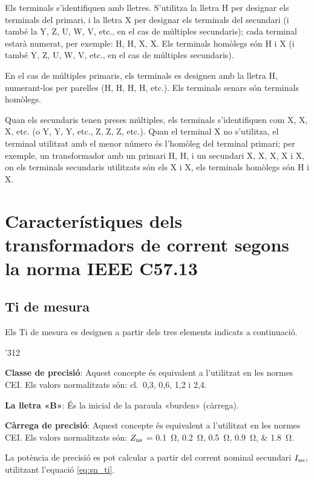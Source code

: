 Els terminals s'identifiquen amb lletres. S'utilitza la lletra H per designar els terminals del primari, i la lletra X per designar els terminals del secundari (i també la Y, Z, U, W, V,  etc.{}, en el cas de múltiples secundaris); cada terminal estarà numerat, per exemple: H, H,  X, X. Els terminals homòlegs són H i X (i també Y, Z, U, W, V, etc.{}, en el cas de múltiples secundaris).

En el cas de múltiples primaris, els terminals es designen amb la lletra H, numerant-los per parelles (H, H, H, H, etc.{}). Els terminals senars són terminals homòlegs.

Quan els secundaris tenen preses múltiples, els terminals s'identifiquen com X, X, X, etc.{} (o Y, Y, Y, etc.{}, Z, Z, Z, etc.{}). Quan el terminal X no s'utilitza, el terminal utilitzat amb el menor número és l'homòleg del terminal primari; per exemple, un transformador amb un primari H, H, i un secundari  X, X, X, X i X, on els terminals secundaris utilitzats són els X i  X, els terminals homòlegs són H i X.


\section{Característiques dels transformadors de corrent segons la norma IEEE C57.13}


\subsection{Ti de mesura}

Els Ti de mesura  es designen a partir
dels tres elements indicats a continuació.

\begin{dingautolist}{'312}
    \item \textbf{Classe de precisió}: Aquest concepte és equivalent
    a l'utilitzat en les normes CEI. Els valors
    normalitzats són: cl.~0,3, 0,6, 1,2 i 2,4.
    \item \textbf{La lletra «B»}: És la inicial de la paraula
    «burden»  (càrrega).
    \item \textbf{Càrrega de precisió}: Aquest concepte és equivalent
    a l'utilitzat en les normes CEI. Els valors
    normalitzats són: $Z_\mathrm{ns}$ = \SIlist{0,1;0,2;0,5;0,9;1,8}{\ohm}.

    La potència de precisió es pot calcular a partir del
    corrent  nominal secundari $I_\mathrm{ns}$, utilitzant l'equació
    \eqref{eq:sn_ti}.
\end{dingautolist}

